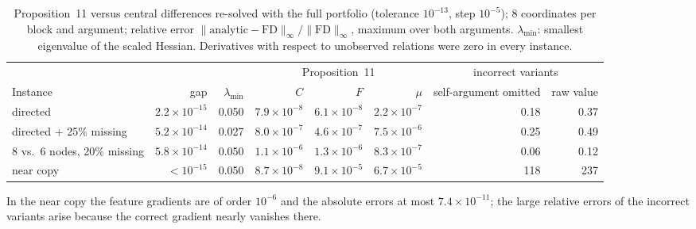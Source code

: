 \begin{table}[h]
\caption{Proposition~11 versus central differences re-solved with the full portfolio (tolerance $10^{-13}$, step $10^{-5}$); 8 coordinates per block and argument; relative error $\|\text{analytic}-\text{FD}\|_\infty/\|\text{FD}\|_\infty$, maximum over both arguments. $\lambda_{\min}$: smallest eigenvalue of the scaled Hessian. Derivatives with respect to unobserved relations were zero in every instance.}\label{tab:sensverif}
\centering\footnotesize
\begin{tabular}{lrrrrrrr}
\toprule
 & & & \multicolumn{3}{c}{Proposition~11} & \multicolumn{2}{c}{incorrect variants}\\
\cmidrule(lr){4-6}\cmidrule(lr){7-8}
Instance & gap & $\lambda_{\min}$ & $C$ & $F$ & $\mu$ & self-argument omitted & raw value\\
\midrule
directed & $2.2\times10^{-15}$ & 0.050 & $7.9\times10^{-8}$ & $6.1\times10^{-8}$ & $2.2\times10^{-7}$ & 0.18 & 0.37\\
directed + 25\% missing & $5.2\times10^{-14}$ & 0.027 & $8.0\times10^{-7}$ & $4.6\times10^{-7}$ & $7.5\times10^{-6}$ & 0.25 & 0.49\\
8 vs.\ 6 nodes, 20\% missing & $5.8\times10^{-14}$ & 0.050 & $1.1\times10^{-6}$ & $1.3\times10^{-6}$ & $8.3\times10^{-7}$ & 0.06 & 0.12\\
near copy & $<10^{-15}$ & 0.050 & $8.7\times10^{-8}$ & $9.1\times10^{-5}$ & $6.7\times10^{-5}$ & 118 & 237\\
\bottomrule
\end{tabular}
\end{table}

In the near copy the feature gradients are of order $10^{-6}$ and the absolute errors at most $7.4\times10^{-11}$; the large relative errors of the incorrect variants arise because the correct gradient nearly vanishes there.


